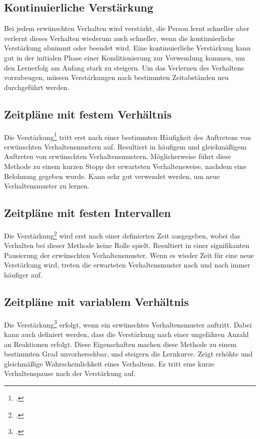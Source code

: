 \subsection{Kontinuierliche Verstärkung}
Bei jedem erwünschten Verhalten wird verstärkt, die Person lernt schneller aber verlernt dieses Verhalten wiederum auch schneller, wenn die kontinuierliche Verstärkung abnimmt oder beendet wird. 
Eine kontinuierliche Verstärkung kann gut in der initialen Phase einer Konditionierung zur Verwendung kommen, um den Lernerfolg am Anfang stark zu steigern.
Um das Verlernen des Verhaltens vorzubeugen, müssen Verstärkungen nach bestimmten Zeitabständen neu durchgeführt werden. 
\subsection{Zeitpläne mit festem Verhältnis}	
Die Verstärkung\footcite{festes-Verhaeltnis} tritt erst nach einer bestimmten Häufigkeit des Auftretens von erwünschten Verhaltensmustern auf.
Resultiert in häufigem und gleichmäßigem Auftreten von erwünschten Verhaltensmustern. Möglicherweise führt diese Methode zu einem kurzen Stopp der erwarteten Verhaltensweise, nachdem eine Belohnung gegeben wurde. 
Kann sehr gut verwendet werden, um neue Verhaltensmuster zu lernen.
\subsection{Zeitpläne mit festen Intervallen}
Die Verstärkung\footcite{fester-Intervall} wird erst nach einer definierten Zeit ausgegeben, wobei das Verhalten bei dieser Methode keine Rolle spielt. 
Resultiert in einer signifikanten Pausierung der erwünschten Verhaltensmuster. Wenn es wieder Zeit für eine neue Verstärkung wird, treten die erwarteten Verhaltensmuster nach und nach immer häufiger auf. 
\subsection{Zeitpläne mit variablem Verhältnis}
Die Verstärkung\footcite{variables-Verhaeltnis} erfolgt, wenn ein erwünschtes Verhaltensmuster auftritt. Dabei kann auch definiert werden, dass die Verstärkung nach einer ungefähren Anzahl an Reaktionen erfolgt. Diese Eigenschaften machen diese Methode zu einem bestimmten Grad unvorhersehbar, und steigern die Lernkurve. 
Zeigt erhöhte und gleichmäßige Wahrscheinlichkeit eines Verhaltens. Es tritt eine kurze Verhaltenspause nach der Verstärkung auf. 
